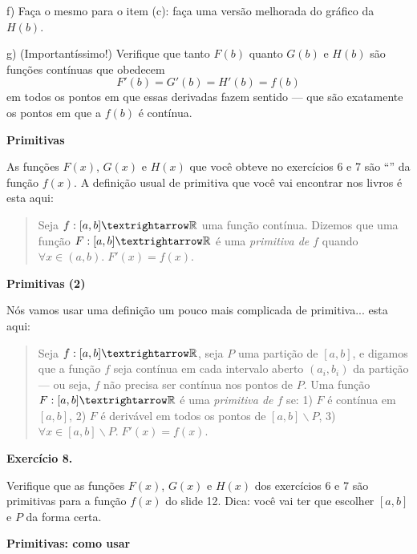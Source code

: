 \documentclass[oneside,12pt]{article}
\begin{document}
f) Faça o mesmo para o item (c): faça uma versão melhorada do gráfico
da $H(b)$.

\msk

g) (Importantíssimo!) Verifique que tanto $F(b)$ quanto $G(b)$ e
$H(b)$ são funções contínuas que obedecem
%
$$F'(b) = G'(b) = H'(b) = f(b)$$
%
em todos os pontos em que essas derivadas fazem sentido --- que são
exatamente os pontos em que a $f(b)$ é contínua.

\newpage

{\bf Primitivas}

\ssk

As funções $F(x)$, $G(x)$ e $H(x)$ que você obteve no exercícios 6 e 7
são ``'' da função $f(x)$. A definição usual de
primitiva que você vai encontrar nos livros é esta aqui:

\begin{quote}
Seja $f:[a,b]→\R$ uma função contínua. Dizemos que uma função
$F:[a,b]→\R$ é uma {\sl primitiva de $f$} quando
$∀x∈(a,b).\;F'(x)=f(x)$.
\end{quote}

\newpage

{\bf Primitivas (2)}

\ssk

Nós vamos usar uma definição um pouco mais complicada de primitiva...
esta aqui:

\begin{quote}
Seja $f:[a,b]→\R$, seja $P$ uma partição de $[a,b]$, e digamos que a
função $f$ seja contínua em cada intervalo aberto $(a_i,b_i)$ da
partição --- ou seja, $f$ não precisa ser contínua nos pontos de $P$.
Uma função $F:[a,b]→\R$ é uma {\sl primitiva de $f$} se: 1) $F$ é
contínua em $[a,b]$, 2) $F$ é derivável em todos os pontos de
$[a,b]∖P$, 3) $∀x∈[a,b]∖P. \; F'(x)=f(x)$.
\end{quote}

\msk

{\bf Exercício 8.}

Verifique que as funções $F(x)$, $G(x)$ e $H(x)$ dos exercícios 6 e 7
são primitivas para a função $f(x)$ do slide 12. Dica: você vai ter
que escolher $[a,b]$ e $P$ da forma certa.

\newpage



{\bf Primitivas: como usar}

\ssk
\end{document}
